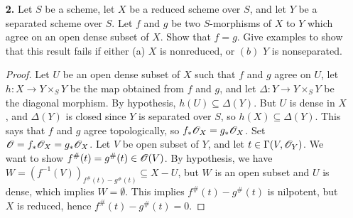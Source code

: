 \documentclass{article}
\begin{document}
\begin{enumerate} [label=\textbf{\arabic*.}, leftmargin=0em]
\begin{proof}
    It follows from these lemmas that if $f : A \to B$ is integral and $C$ is any $A$-algebra, then the mapping $(f \otimes 1)^* : \text{Spec}(B \otimes_A C) \to \spec{C}$ is a closed map. Let $f : X \to Y$ be a finite morphism of schemes. A finite morphism is an affine morphism (Ex. 3.4), so by (4.6f) we reduce to the case when $X = \spec{B}$ and $Y = \spec{A}$, where $B$ is a finite $A$-module (hence integral over $A$), and $f$ is induced by a ring homomorphism $A \to B$. Morphisms between affine schemes are separated (4.1), and finite morphisms are of finite type, so it remains to show $f$ is universally closed. If $Y' \to Y$ is any morphism, then we want to show $X \times_Y Y' \to Y'$ is a closed mapping. There is an open cover of $Y'$ by spectra of $A$-algebras $C_i$ so that the fiber product $X \times_Y Y'$ is covered by spectra of $B \otimes_A C_i$. By the above remarks, the morphisms $\text{Spec}(B \otimes_A C_i) \to \spec{C_i}$ are closed, hence $X \times_Y Y' \to Y'$ is closed.
\end{proof}

\item[\textbf{2.}] Let $S$ be a scheme, let $X$ be a reduced scheme over $S$, and let $Y$ be a separated scheme over $S$. Let $f$ and $g$ be two $S$-morphisms of $X$ to $Y$ which agree on an open dense subset of $X$. Show that $f = g$. Give examples to show that this result fails if either (a) $X$ is nonreduced, or $(b)$ $Y$ is nonseparated.

\begin{proof}
    Let $U$ be an open dense subset of $X$ such that $f$ and $g$ agree on $U$, let $h : X \to Y \times_S Y$ be the map obtained from $f$ and $g$, and let $\Delta : Y \to Y \times_S Y$ be the diagonal morphism. By hypothesis, $h(U) \subseteq \Delta(Y)$. But $U$ is dense in $X$, and $\Delta(Y)$ is closed since $Y$ is separated over $S$, so $h(X) \subseteq \Delta(Y)$. This says that $f$ and $g$ agree topologically, so $f_*\mathscr{O}_X = g_*\mathscr{O}_X$. Set $\mathscr{O} = f_* \mathscr{O}_X = g_*\mathscr{O}_X$. Let $V$ be open subset of $Y$, and let $t \in \Gamma(V, \mathscr{O}_Y)$. We want to show $f^\#(t) = g^\#(t) \in \mathscr{O}(V)$. By hypothesis, we have $W = (f^{-1}(V))_{f^\#(t) - g^\#(t)} \subseteq X - U$, but $W$ is an open subset and $U$ is dense, which implies $W = \emptyset$. This implies $f^\#(t) - g^\#(t)$ is nilpotent, but $X$ is reduced, hence $f^\#(t) - g^\#(t) = 0$.


\end{proof}
\end{enumerate}
\end{document}
